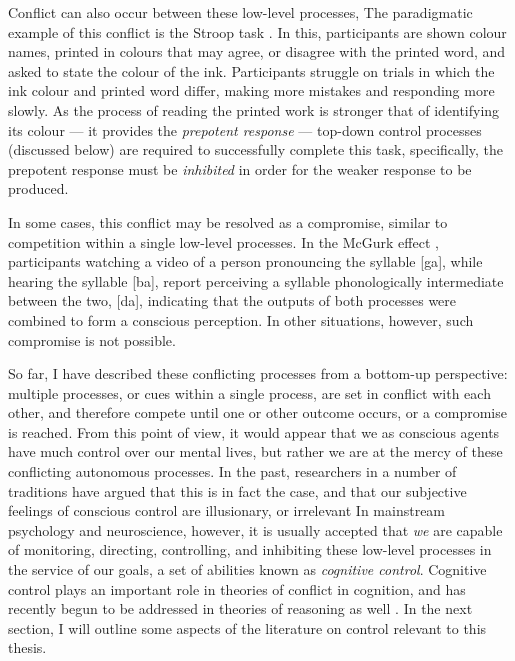 Conflict can also occur between these low-level processes,
The paradigmatic example of this conflict is the Stroop task \citep{Stroop1935}.
In this, participants are shown colour names,
printed in colours that may agree, or disagree with the printed word,
and asked to state the colour of the ink.
Participants struggle on trials in which the ink colour and printed word differ,
making more mistakes and responding more slowly.
As the process of reading the printed work is
stronger that of identifying its colour ---
it provides the \emph{prepotent response} ---
top-down control processes (discussed below)
are required to successfully complete this task,
specifically, the prepotent response must be \emph{inhibited}
in order for the weaker response to be produced.

In some cases, this conflict may be resolved as a compromise,
similar to competition within a single low-level processes.
In the McGurk effect \citep{Mcgurk1976},
participants watching a video of a person pronouncing the syllable {[}ga{]},
while hearing the syllable {[}ba{]},
report perceiving a syllable phonologically intermediate between the two, {[}da{]},
indicating that the outputs of both processes 
were combined to form a conscious perception.
In other situations, however, such compromise is not possible.

So far, I have described these conflicting processes
from a bottom-up perspective:
multiple processes, or cues within a single process,
are set in conflict with each other,
and therefore compete until one or other outcome occurs,
or a compromise is reached.
From this point of view, it would appear that we as conscious agents
have much control over our mental lives,
but rather we are at the mercy of these
conflicting autonomous processes.
In the past, researchers in a number of traditions
have argued that this is in fact the case,
and that our subjective feelings of conscious control
are illusionary, or irrelevant
\citep[e.g.][]{Skinner1965,Gibson1986}
In mainstream psychology and neuroscience, however,
it is usually accepted that \emph{we} are capable of
monitoring, directing, controlling, and inhibiting
these low-level processes in the service of our goals,
a set of abilities known as \emph{cognitive control}.
Cognitive control plays an important role in theories of conflict in cognition,
and has recently begun to be addressed in theories of reasoning as well \citep{DeNeys2012}.
In the next section, I will outline some aspects of
the literature on control relevant to this thesis.


